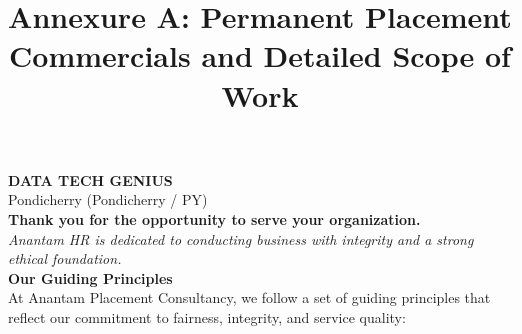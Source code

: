 \documentclass{article}
\title{\textbf{\color{primary} Annexure A: Permanent Placement Commercials and Detailed Scope of Work}}
\date{}
\begin{document}
\maketitle

\noindent\textbf{DATA TECH GENIUS}\\
Pondicherry (Pondicherry / PY)\\[1em]

\noindent\textbf{Thank you for the opportunity to serve your organization.}\\[0.5em]
\noindent\textit{Anantam HR is dedicated to conducting business with integrity and a strong ethical foundation.}\\[1em]

\noindent\textbf{\color{secondary} Our Guiding Principles}\\[0.5em]
\noindent At Anantam Placement Consultancy, we follow a set of guiding principles that reflect our commitment to fairness, integrity, and service quality:
\end{document}
